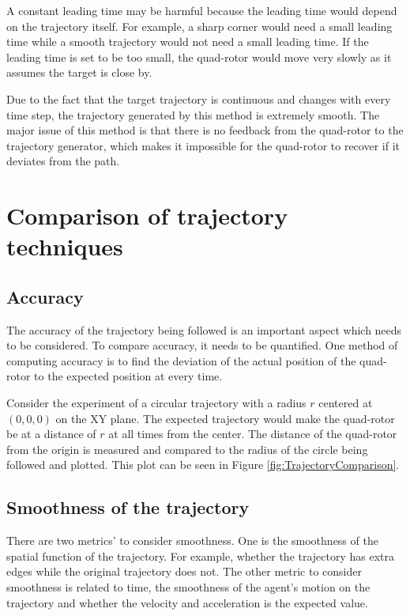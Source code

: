 \documentclass[hidelinks,BTech]{iitmdiss}
\begin{document}
A constant leading time may be harmful because the leading time would depend on the trajectory itself. For example, a sharp corner would need a small leading time while a smooth trajectory would not need a small leading time. If the leading time is set to be too small, the quad-rotor would move very slowly as it assumes the target is close by.

Due to the fact that the target trajectory is continuous and changes with every time step, the trajectory generated by this method is extremely smooth. The major issue of this method is that there is no feedback from the quad-rotor to the trajectory generator, which makes it impossible for the quad-rotor to recover if it deviates from the path.

\section{Comparison of trajectory techniques}

\subsection{Accuracy}
The accuracy of the trajectory being followed is an important aspect which needs to be considered. To compare accuracy, it needs to be quantified. One method of computing accuracy is to find the deviation of the actual position of the quad-rotor to the expected position at every time.

Consider the experiment of a circular trajectory with a radius $r$ centered at $(0,0,0)$ on the XY plane. The expected trajectory would make the quad-rotor be at a distance of $r$ at all times from the center. The distance of the quad-rotor from the origin is measured and compared to the radius of the circle being followed and plotted. This plot can be seen in Figure \ref{fig:TrajectoryComparison}.

\subsection{Smoothness of the trajectory}
There are two metrics' to consider smoothness. One is the smoothness of the spatial function of the trajectory. For example, whether the trajectory has extra edges while the original trajectory does not. The other metric to consider smoothness is related to time, the smoothness of the agent's motion on the trajectory and whether the velocity and acceleration is the expected value.
\end{document}
